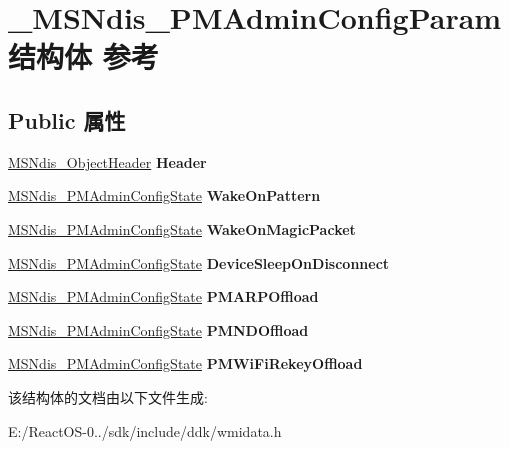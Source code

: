 \hypertarget{struct___m_s_ndis___p_m_admin_config_param}{}\section{\+\_\+\+M\+S\+Ndis\+\_\+\+P\+M\+Admin\+Config\+Param结构体 参考}
\label{struct___m_s_ndis___p_m_admin_config_param}
\subsection*{Public 属性}
\begin{DoxyCompactItemize}
\item 
\mbox{\label{struct___m_s_ndis___p_m_admin_config_param_aa31c627851edafff42a076ca27d932e9}} 
\hyperlink{struct___m_s_ndis___object_header}{M\+S\+Ndis\+\_\+\+Object\+Header} {\bfseries Header}
\item 
\mbox{\label{struct___m_s_ndis___p_m_admin_config_param_a5b9102454968a646a3d2f4539eb81891}} 
\hyperlink{struct___m_s_ndis___p_m_admin_config_state}{M\+S\+Ndis\+\_\+\+P\+M\+Admin\+Config\+State} {\bfseries Wake\+On\+Pattern}
\item 
\mbox{\label{struct___m_s_ndis___p_m_admin_config_param_a5907588bf791b5fcb7c85c0962a657de}} 
\hyperlink{struct___m_s_ndis___p_m_admin_config_state}{M\+S\+Ndis\+\_\+\+P\+M\+Admin\+Config\+State} {\bfseries Wake\+On\+Magic\+Packet}
\item 
\mbox{\label{struct___m_s_ndis___p_m_admin_config_param_a887908a77ebaf252bff125efaf47d3d4}} 
\hyperlink{struct___m_s_ndis___p_m_admin_config_state}{M\+S\+Ndis\+\_\+\+P\+M\+Admin\+Config\+State} {\bfseries Device\+Sleep\+On\+Disconnect}
\item 
\mbox{\label{struct___m_s_ndis___p_m_admin_config_param_af21ef25bb3d3e6807759d7d94d214d8a}} 
\hyperlink{struct___m_s_ndis___p_m_admin_config_state}{M\+S\+Ndis\+\_\+\+P\+M\+Admin\+Config\+State} {\bfseries P\+M\+A\+R\+P\+Offload}
\item 
\mbox{\label{struct___m_s_ndis___p_m_admin_config_param_a395144a01625540b1cdfcb52553f92ec}} 
\hyperlink{struct___m_s_ndis___p_m_admin_config_state}{M\+S\+Ndis\+\_\+\+P\+M\+Admin\+Config\+State} {\bfseries P\+M\+N\+D\+Offload}
\item 
\mbox{\label{struct___m_s_ndis___p_m_admin_config_param_a543e720aadb2b76a997b07d301ab6cb1}} 
\hyperlink{struct___m_s_ndis___p_m_admin_config_state}{M\+S\+Ndis\+\_\+\+P\+M\+Admin\+Config\+State} {\bfseries P\+M\+Wi\+Fi\+Rekey\+Offload}
\end{DoxyCompactItemize}


该结构体的文档由以下文件生成\+:\begin{DoxyCompactItemize}
\item 
E\+:/\+React\+O\+S-\/0../sdk/include/ddk/wmidata.\+h\end{DoxyCompactItemize}

